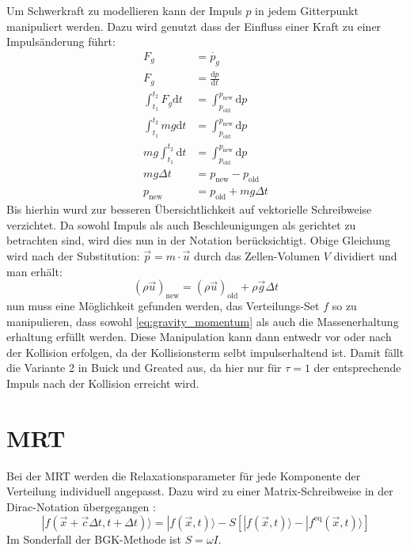 \documentclass[a4paper,10pt]{scrreprt}
\begin{document}
Um Schwerkraft zu modellieren kann der Impuls $p$ in jedem Gitterpunkt manipuliert werden. Dazu wird genutzt dass der Einfluss einer Kraft zu einer Impulsänderung führt:
\begin{align}
 F_g &= \dot{p_g} \\
 F_g &= \frac{\text{d} p}{\text{d} t} \\
\int_{t_1}^{t_2} F_g \text{d} t &= \int_{p_{\text{old}}}^{p_{\text{new}}} \text{d} p \\
\int_{t_1}^{t_2} m g \text{d} t &= \int_{p_{\text{old}}}^{p_{\text{new}}} \text{d} p \\
m g \int_{t_1}^{t_2} \text{d} t &= \int_{p_{\text{old}}}^{p_{\text{new}}} \text{d} p \\
m g \Delta t &= p_{\text{new}} - p_{\text{old}} \\
p_{\text{new}} &= p_{\text{old}} + m g \Delta t
\end{align}
Bis hierhin wurd zur besseren Übersichtlichkeit auf vektorielle Schreibweise verzichtet. Da sowohl Impuls als auch Beschleunigungen als gerichtet zu betrachten sind, wird dies nun in der Notation berücksichtigt.
Obige Gleichung wird nach der Substitution: $\vec{p} = m \cdot \vec{u}$  durch das Zellen-Volumen $V$ dividiert und man erhält:
\begin{equation}
\label{eq:gravity_momentum}
 (\rho \vec{u})_{\text{new}} = (\rho \vec{u})_{\text{old}} + \rho \vec{g} \Delta t
\end{equation}
nun muss eine Möglichkeit gefunden werden, das Verteilungs-Set $f$ so zu manipulieren, dass sowohl \eqref{eq:gravity_momentum} als auch die Massenerhaltung erhaltung erfüllt werden. Diese Manipulation kann dann entwedr vor oder nach der Kollision erfolgen, da der Kollisionsterm selbt impulserhaltend ist.
Damit fällt die Variante 2 in Buick und Greated \cite{Buick2000} aus, da hier nur für $\tau =1$ der entsprechende Impuls nach der Kollision erreicht wird.


\section{MRT}
\label{chap:MRT}
Bei der MRT werden die Relaxationsparameter für jede Komponente der Verteilung individuell angepasst. Dazu wird zu einer Matrix-Schreibweise in der Dirac-Notation übergegangen \cite{2002}:
\begin{equation}
\label{eq:MRTbasic}
 | f(\vec{x} + \vec{c} \Delta t, t + \Delta t) \rangle = | f(\vec{x},t) \rangle - S [ | f(\vec{x},t) \rangle - | f^{\text{eq}}(\vec{x},t) \rangle]
\end{equation}
Im Sonderfall der BGK-Methode ist $S = \omega I$.
\end{document}
